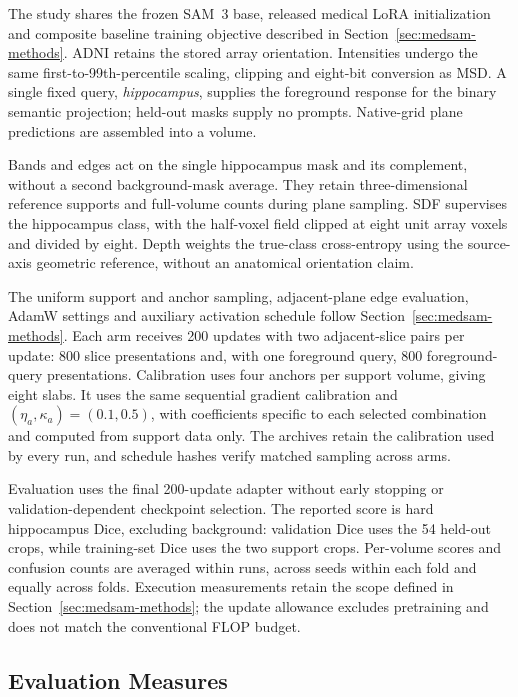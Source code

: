 \documentclass[12pt,a4paper]{article}
\begin{document}
The study shares the frozen SAM~3 base, released medical LoRA
initialization and composite baseline training objective
described in Section~\ref{sec:medsam-methods}.
ADNI retains the stored array orientation. Intensities undergo the
same first-to-99th-percentile scaling, clipping and eight-bit conversion
as MSD. A single fixed query, \emph{hippocampus}, supplies the foreground
response for the binary semantic projection; held-out masks supply no
prompts. Native-grid plane predictions are assembled into a volume.


Bands and edges act on the single hippocampus mask and its complement,
without a second background-mask average. They retain three-dimensional
reference supports and full-volume counts during plane sampling.
SDF supervises the hippocampus class, with the half-voxel field clipped
at eight unit array voxels and divided by eight. Depth weights the
true-class cross-entropy using the source-axis geometric reference,
without an anatomical orientation claim.

The uniform support and anchor sampling, adjacent-plane edge evaluation,
AdamW settings and auxiliary activation schedule follow
Section~\ref{sec:medsam-methods}. Each arm receives 200 updates with two
adjacent-slice pairs per update: 800 slice presentations and, with one
foreground query, 800 foreground-query presentations. Calibration uses
four anchors per support volume, giving eight slabs. It uses the same
sequential gradient calibration and $(\eta_a,\kappa_a)=(0.1,0.5)$,
with coefficients specific to each selected combination and computed
from support data only. The archives retain the calibration used by
every run, and schedule hashes verify matched sampling across arms.

Evaluation uses the final 200-update adapter without early stopping or
validation-dependent checkpoint selection. The reported score is hard
hippocampus Dice, excluding background: validation Dice uses the 54
held-out crops, while training-set Dice uses the two support crops.
Per-volume scores and
confusion counts are averaged within runs, across seeds within each
fold and equally across folds. Execution measurements retain the scope
defined in Section~\ref{sec:medsam-methods}; the update allowance excludes
pretraining and does not match the conventional FLOP budget.

\subsection{Evaluation Measures}
\label{sec:evaluation-methods}
\end{document}
